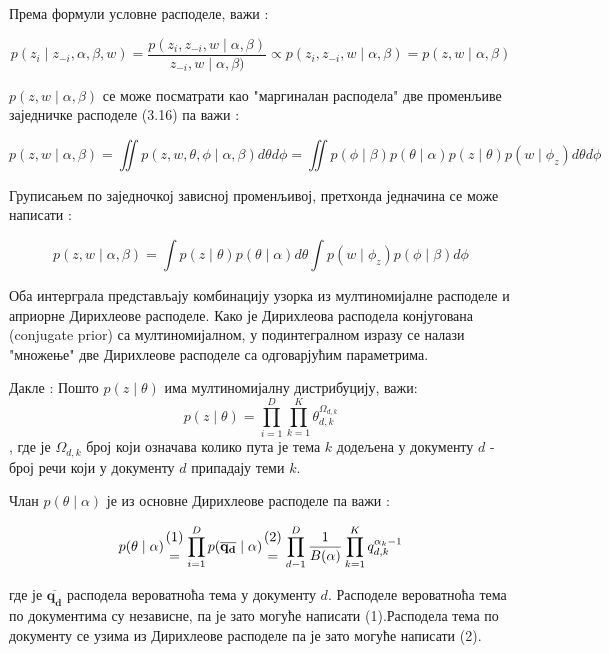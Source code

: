 Према формули условне расподеле, важи :


\begin{equation}
p(z_i \mid z_{-i},\alpha,\beta,w) = \frac{p(z_i,z_{-i},w \mid \alpha,\beta)}{z_{-i},w \mid \alpha,\beta)} \propto p(z_i,z_{-i},w \mid \alpha,\beta) = p(z,w \mid \alpha,\beta)
\end{equation}

$p(z,w \mid \alpha,\beta)$ се може посматрати као "маргиналан расподела" две променљиве  заједничке расподеле (3.16)  па важи :

\begin{equation}
p(z,w \mid \alpha,\beta) = \iint p(z,w,\theta,\phi \mid \alpha,\beta)d\theta d\phi = \iint p(\phi \mid \beta)p(\theta \mid \alpha)p(z \mid \theta)p(w \mid \phi_z) d\theta d\phi 
\end{equation}

Груписањем по заједночкој зависној променљивој, претхонда једначина се може написати :

\begin{equation}
p(z,w \mid \alpha,\beta) = \int p(z \mid \theta)p(\theta \mid \alpha)d\theta \int p(w \mid \phi_z)p(\phi \mid \beta)d\phi
\end{equation}

Оба интерграла представљају комбинацију узорка из мултиномијалне расподеле и априорне Дирихлеове расподеле. Како је Дирихлеова расподела конјугована (conjugate prior) са мултиномијалном, у подинтегралном изразу се налази "множење" две Дирихлеове расподеле са одговарјућим параметрима.

Дакле :
Пошто  $p(z \mid \theta)$ има мултиномијалну дистрибуцију, важи:
\begin{equation}
p(z \mid \theta) = \prod_{i=1}^D \prod_{k=1}^K \theta_{d,k}^{\Omega_{d,k}}
\end{equation}
, где је $\Omega_{d,k}$ број који означава колико пута је тема $k$ додељена у документу $d$ - број речи који у документу $d$ припадају теми $k$.

Члан $p(\theta \mid \alpha)$ је из основне Дирихлеове расподеле па важи :

\begin{equation}
	p(\theta \mid \alpha)  {(1) \atop = }\prod_{i=1}^D p(\mathbf{\overline{q_d}} \mid \alpha) {(2) \atop = }
	 \prod_{d-1}^D \frac{1}{B(\alpha)}\prod_{k=1}^K q_{d,k}^{\alpha_k -1}
\end{equation}



где је $\mathbf{\overline{q_d}}$ расподела вероватноћа тема у документу $d$. Расподеле вероватноћа тема по документима су независне, па је зато могуће написати (1).Расподела тема по документу се узима из Дирихлеове расподеле па је зато могуће написати (2).

